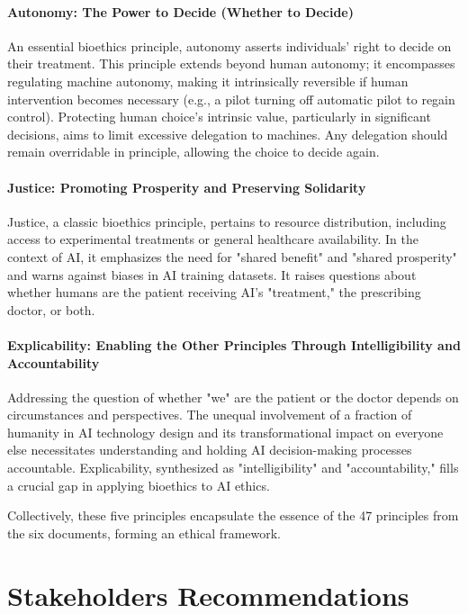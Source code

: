 \paragraph{Autonomy: The Power to Decide (Whether to Decide)}
An essential bioethics principle, autonomy asserts individuals' right to decide on their treatment. This principle extends beyond human autonomy; it encompasses regulating machine autonomy, making it intrinsically reversible if human intervention becomes necessary (e.g., a pilot turning off automatic pilot to regain control). Protecting human choice's intrinsic value, particularly in significant decisions, aims to limit excessive delegation to machines. Any delegation should remain overridable in principle, allowing the choice to decide again.

\paragraph{Justice: Promoting Prosperity and Preserving Solidarity}
Justice, a classic bioethics principle, pertains to resource distribution, including access to experimental treatments or general healthcare availability. In the context of AI, it emphasizes the need for "shared benefit" and "shared prosperity" and warns against biases in AI training datasets. It raises questions about whether humans are the patient receiving AI's "treatment," the prescribing doctor, or both.

\paragraph{Explicability: Enabling the Other Principles Through Intelligibility and Accountability}
Addressing the question of whether "we" are the patient or the doctor depends on circumstances and perspectives. The unequal involvement of a fraction of humanity in AI technology design and its transformational impact on everyone else necessitates understanding and holding AI decision-making processes accountable. Explicability, synthesized as "intelligibility" and "accountability," fills a crucial gap in applying bioethics to AI ethics. \newline

Collectively, these five principles encapsulate the essence of the 47 principles from the six documents, forming an ethical framework.

\section{Stakeholders Recommendations}

